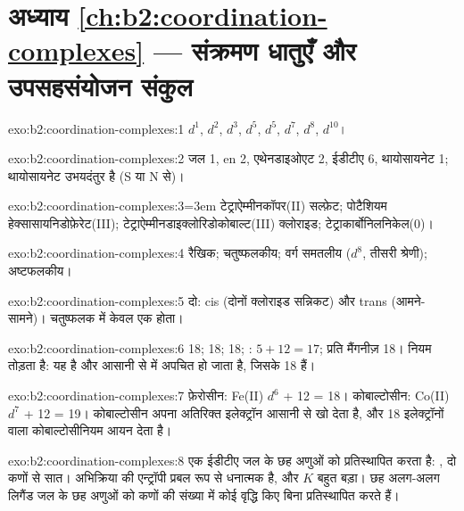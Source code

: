 \section*{अध्याय \ref{ch:b2:coordination-complexes} --- संक्रमण धातुएँ और उपसहसंयोजन संकुल}

\begin{solution}{exo:b2:coordination-complexes:1}
 $d^1$,  $d^2$,  $d^3$,  $d^5$,  $d^5$, 
$d^7$,  $d^8$,  $d^{10}$।
\end{solution}

\begin{solution}{exo:b2:coordination-complexes:2}
जल 1, en 2, एथेनडाइओएट 2, ईडीटीए 6, थायोसायनेट 1; थायोसायनेट उभयदंतुर है
(S या N से)।
\end{solution}

\begin{solution}{exo:b2:coordination-complexes:3}\emergencystretch=3em
टेट्राऐम्मीनकॉपर(II) सल्फ़ेट; पोटैशियम हेक्सासायनिडोफ़ेरेट(III);
टेट्राऐम्मीनडाइक्लोरिडोकोबाल्ट(III) क्लोराइड; टेट्राकार्बोनिलनिकेल(0)।
\end{solution}

\begin{solution}{exo:b2:coordination-complexes:4}
रैखिक; चतुष्फलकीय; वर्ग समतलीय ($d^8$, तीसरी श्रेणी); अष्टफलकीय।
\end{solution}

\begin{solution}{exo:b2:coordination-complexes:5}
दो: cis (दोनों क्लोराइड सन्निकट) और trans (आमने-सामने)। चतुष्फलक में
केवल एक होता।
\end{solution}

\begin{solution}{exo:b2:coordination-complexes:6}
 18;  18;  18; : $5 + 12 = 17$;
 प्रति मैंगनीज़ 18।  नियम तोड़ता है: यह  है और
आसानी से \ce{[V(CO)6]-} में अपचित हो जाता है, जिसके 18 हैं।
\end{solution}

\begin{solution}{exo:b2:coordination-complexes:7}
फ़ेरोसीन: Fe(II) $d^6$ + 12 = 18। कोबाल्टोसीन: Co(II) $d^7$ + 12 = 19। कोबाल्टोसीन
अपना अतिरिक्त इलेक्ट्रॉन आसानी से खो देता है, और 18 इलेक्ट्रॉनों वाला कोबाल्टोसीनियम आयन \ce{[Co(C5H5)2]+} देता है।
\end{solution}

\begin{solution}{exo:b2:coordination-complexes:8}
एक ईडीटीए जल के छह अणुओं को प्रतिस्थापित करता है: , दो कणों से सात। अभिक्रिया की एन्ट्रॉपी प्रबल रूप से धनात्मक है, और
$K$ बहुत बड़ा। छह अलग-अलग लिगैंड जल के छह अणुओं को कणों की संख्या में
कोई वृद्धि किए बिना प्रतिस्थापित करते हैं।
\end{solution}

